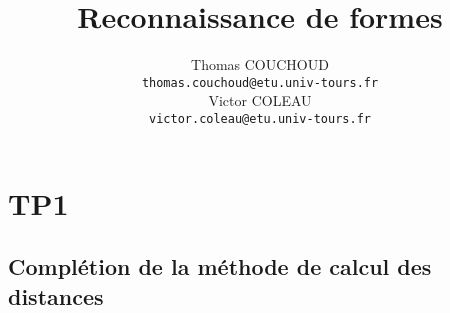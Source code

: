 \documentclass{report}
\title{Reconnaissance de formes}
\author{Thomas COUCHOUD\\\texttt{thomas.couchoud@etu.univ-tours.fr}\\Victor COLEAU\\\texttt{victor.coleau@etu.univ-tours.fr}}
\begin{document}
	\mccTitle
	\chapter{TP1}
		\section{Complétion de la méthode de calcul des distances}
			
\end{document}
